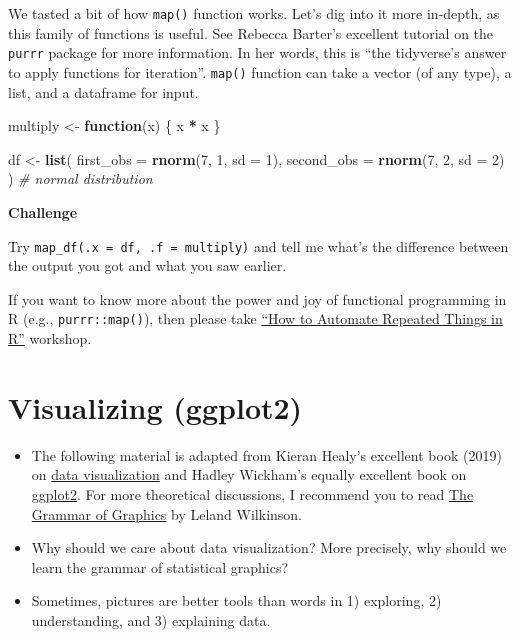\documentclass[
]{book}
\newenvironment{Shaded}{\begin{snugshade}}{\end{snugshade}}
\newcommand{\AttributeTok}[1]{\textcolor[rgb]{0.13,0.29,0.53}{#1}}
\newcommand{\CommentTok}[1]{\textcolor[rgb]{0.56,0.35,0.01}{\textit{#1}}}
\newcommand{\ControlFlowTok}[1]{\textcolor[rgb]{0.13,0.29,0.53}{\textbf{#1}}}
\newcommand{\DecValTok}[1]{\textcolor[rgb]{0.00,0.00,0.81}{#1}}
\newcommand{\FunctionTok}[1]{\textcolor[rgb]{0.13,0.29,0.53}{\textbf{#1}}}
\newcommand{\NormalTok}[1]{#1}
\newcommand{\OtherTok}[1]{\textcolor[rgb]{0.56,0.35,0.01}{#1}}
\newcommand{\SpecialCharTok}[1]{\textcolor[rgb]{0.81,0.36,0.00}{\textbf{#1}}}
\begin{document}
We tasted a bit of how \texttt{map()} function works. Let's dig into it more in-depth, as this family of functions is useful. See Rebecca Barter's excellent tutorial on the \texttt{purrr} package for more information. In her words, this is ``the tidyverse's answer to apply functions for iteration''. \texttt{map()} function can take a vector (of any type), a list, and a dataframe for input.

\begin{Shaded}
\begin{Highlighting}[]
\NormalTok{multiply }\OtherTok{\textless{}{-}} \ControlFlowTok{function}\NormalTok{(x) \{}
\NormalTok{  x }\SpecialCharTok{*}\NormalTok{ x}
\NormalTok{\}}

\NormalTok{df }\OtherTok{\textless{}{-}} \FunctionTok{list}\NormalTok{(}
  \AttributeTok{first\_obs =} \FunctionTok{rnorm}\NormalTok{(}\DecValTok{7}\NormalTok{, }\DecValTok{1}\NormalTok{, }\AttributeTok{sd =} \DecValTok{1}\NormalTok{),}
  \AttributeTok{second\_obs =} \FunctionTok{rnorm}\NormalTok{(}\DecValTok{7}\NormalTok{, }\DecValTok{2}\NormalTok{, }\AttributeTok{sd =} \DecValTok{2}\NormalTok{)}
\NormalTok{) }\CommentTok{\# normal distribution}
\end{Highlighting}
\end{Shaded}

\textbf{Challenge}

Try \texttt{map\_df(.x\ =\ df,\ .f\ =\ multiply)} and tell me what's the difference between the output you got and what you saw earlier.

If you want to know more about the power and joy of functional programming in R (e.g., \texttt{purrr::map()}), then please take \href{https://github.com/dlab-berkeley/R-functional-programming}{``How to Automate Repeated Things in R''} workshop.

\section{Visualizing (ggplot2)}\label{visualizing-ggplot2}

\begin{itemize}
\item
  The following material is adapted from Kieran Healy's excellent book (2019) on \href{https://socviz.co/}{data visualization} and Hadley Wickham's equally excellent book on \href{https://ggplot2-book.org/}{ggplot2}. For more theoretical discussions, I recommend you to read \href{https://link.springer.com/book/10.1007\%2F0-387-28695-0}{The Grammar of Graphics} by Leland Wilkinson.
\item
  Why should we care about data visualization? More precisely, why should we learn the grammar of statistical graphics?
\item
  Sometimes, pictures are better tools than words in 1) exploring, 2) understanding, and 3) explaining data.
\end{itemize}
\end{document}
